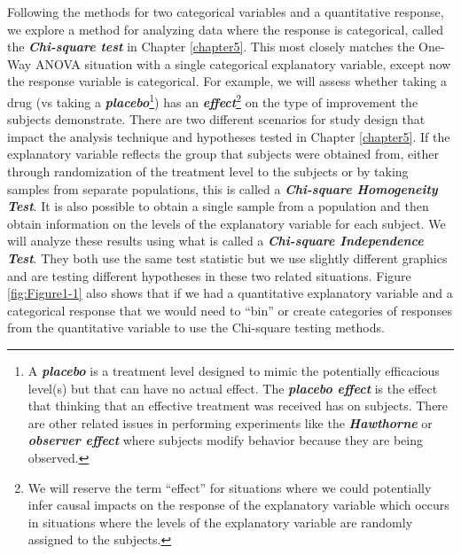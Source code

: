 \documentclass[
]{book}
\begin{document}
\indent Following the methods for two categorical variables and a quantitative response, we explore a method for
analyzing data where the response is categorical, called the \textbf{\emph{Chi-square test}}
in Chapter \ref{chapter5}. This most closely matches the One-Way ANOVA
situation with a single categorical explanatory variable, except now the
response variable is categorical. For example, we will assess whether taking a
drug (vs taking a \textbf{\emph{placebo}}\footnote{A \textbf{\emph{placebo}} is a treatment level designed to
  mimic the potentially efficacious level(s) but that can have no actual effect. The
  \textbf{\emph{placebo effect}} is the effect that thinking that an effective treatment was
  received has on subjects. There are other related issues in performing experiments
  like the \textbf{\emph{Hawthorne}} or \textbf{\emph{observer effect}} where subjects modify behavior
  because they are being observed.})
has an \textbf{\emph{effect}}\footnote{We will reserve the term ``effect'' for situations where we could
  potentially infer causal impacts on the response of the explanatory variable which
  occurs in situations where the levels of the explanatory variable are randomly
  assigned to the subjects.} on the type of improvement the subjects demonstrate. There
are two different scenarios
for study design that impact the analysis technique and hypotheses tested in
Chapter \ref{chapter5}. If the explanatory variable reflects the group that
subjects were
obtained from, either through randomization of the treatment level to the
subjects or by taking samples from separate populations, this is called a
\textbf{\emph{Chi-square Homogeneity Test}}.  It is also possible to obtain a single sample
from a population and then obtain information on the levels of the explanatory
variable for each
subject. We will analyze these results using what is called a \textbf{\emph{Chi-square Independence Test}}.
 They both use the same test statistic but we use slightly different graphics and are testing different hypotheses in these two related
situations. Figure \ref{fig:Figure1-1} also shows that if we had a quantitative explanatory
variable and a categorical response that we would need to ``bin'' or create
categories of responses from the quantitative variable to use the Chi-square
testing methods.
\end{document}
